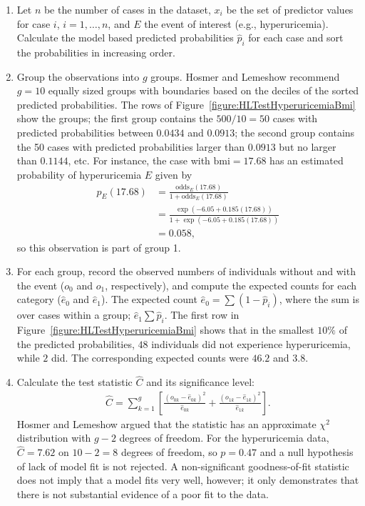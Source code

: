 \begin{enumerate}
  \item Let $n$ be the number of cases in the dataset, $x_i$ be the set of predictor values for case $i$, $i = 1, \ldots, n$, and $E$ the event of interest (e.g., hyperuricemia). Calculate the model based predicted probabilities $\hat{p}_i$ for each case and sort the probabilities in increasing order.

  \item Group the observations into $g$ groups.   Hosmer and Lemeshow recommend $g = 10$ equally sized groups with boundaries based on the deciles of the sorted predicted probabilities.  The rows of Figure~\ref{figure:HLTestHyperuricemiaBmi} show the groups; the first group contains the $500/10 = 50$ cases with predicted probabilities between $0.0434$ and $0.0913$; the second group contains the 50 cases with predicted probabilities larger than $0.0913$ but no larger than $0.1144$, etc.  For instance, the case with $\textrm{bmi} = 17.68$ has an estimated probability of hyperuricemia $E$ given by
\begin{align*}
  p_{E}(17.68) &= \frac{\textrm{odds}_{E}(17.68)}
    {1 + \textrm{odds}_{E}(17.68)} \\
    &= \frac{\exp(-6.05 + 0.185(17.68))}
    {1 + \exp(-6.05 + 0.185(17.68))} \\
    &= 0.058,
\end{align*}
so this observation is part of group 1.

   \item For each group, record the observed numbers of individuals without and with the event ($o_0$ and $o_1$, respectively), and compute the expected counts for each category ($\hat{e}_0$ and $\hat{e}_1$).  The expected count $\hat{e}_0 =\sum(1 - \hat{p}_i)$, where the sum is over cases within a group; $\hat{e}_1 \sum \hat{p}_i$. The first row in Figure~\ref{figure:HLTestHyperuricemiaBmi} shows that in the smallest $10\%$ of the predicted probabilities, $48$ individuals did not experience hyperuricemia, while $2$ did.  The corresponding expected counts were $46.2$ and $3.8$.

  \item Calculate the test statistic $\hat{C}$ and its significance level:
  \begin{align*}
    \hat{C} = \sum_{k=1}^g \left[\frac{(o_{0k} - \hat{e}_{0k})^2}
            {\hat{e}_{0k}} +
            \frac{(o_{1k} - \hat{e}_{1k})^2}
            {\hat{e}_{1k}} \right].
\end{align*}
 Hosmer and Lemeshow argued that the statistic has an approximate $\chi^2$ distribution with $g - 2$ degrees of freedom.  For the hyperuricemia data, $\hat{C} = 7.62$ on $10 - 2 = 8$ degrees of freedom, so $p = 0.47$ and a null hypothesis of lack of model fit is not rejected.  A non-significant goodness-of-fit statistic does not imply that a model fits very well, however; it only demonstrates that there is not substantial evidence of a poor fit to the data.

\end{enumerate}

